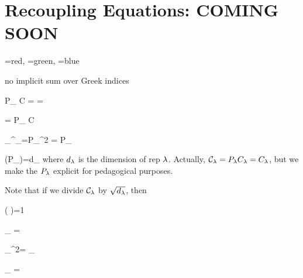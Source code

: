\chapter{Recoupling Equations: COMING SOON}
\label{ch-recoupling}






\beq
\lam =red,\quad
\mu=green,\quad
\nu=blue
\eeq

no implicit sum over Greek indices

\beq P_\lam
C
=
\bcen
{}
\ecen
=
\bcen
{}
\ecen
\eeq

\beq
\calc\indices{
_\lam
^\nu
^\mu
} = P_\lam
C\indices{
_\lam
^\nu
^\mu
}
\eeq

\beq
\calc_\lam \calc^\dagger_\lam=P_\lam^2 = P_\lam
\eeq

\beq
\tr(P_\lam)=d_\lam
\eeq
where $d_\lambda$ is the dimension of rep $\lambda$.
Actually, ${\cal C}_\lambda=P_\lambda C_\lambda=C_\lambda$,
but we make the $P_\lambda$ explicit
for pedagogical purposes.

Note that if we divide
${\cal C}_\lambda$ by $\sqrt{d_\lambda}$,
then

\beq
\tr\left(\frac{\calc_\lam}
{} 
\frac{\calc^\dagger_\lam}
{} 
\right)=1
\eeq



\beq
{\color{red}\calp_\lam}
=
\bcen
{}
\ecen
\eeq

\beq
\calp_\lam^2=
\calp_\lam
\eeq


\beq
{\color{blue}\calp_\nu}
=
\bcen
{}
\ecen
\eeq

